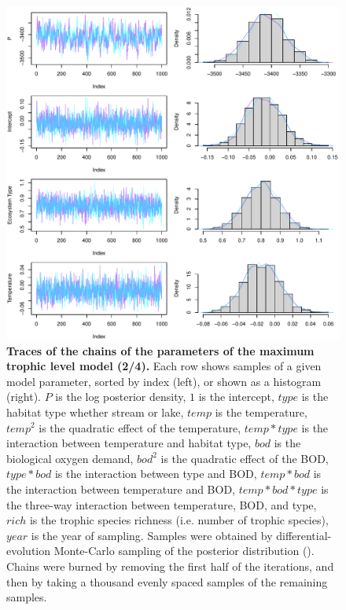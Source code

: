 \documentclass[11pt, oneside]{article}
\begin{document}
\begin{figure}[H]
\begin{center}
\includegraphics[page=2, width=1\linewidth]{scripts/b0_6_4/out_mTL/fig_tracePlot_beta.pdf}
\caption{
    \textbf{Traces of the chains of the parameters of the maximum trophic level model (2/4).}
    Each row shows samples of a given model parameter, sorted by index (left), or shown as a histogram (right).
    $P$ is the log posterior density, $1$ is the intercept, $type$ is the habitat type whether stream or lake, $temp$ is the temperature, $temp^2$ is the quadratic effect of the temperature, $temp * type$ is the interaction between temperature and habitat type, $bod$ is the biological oxygen demand, $bod^2$ is the quadratic effect of the BOD, $type * bod$ is the interaction between type and BOD, $temp * bod$ is the interaction between temperature and BOD, $temp * bod * type$ is the three-way interaction between temperature, BOD, and type, $rich$ is the trophic species richness (i.e. number of trophic species), $year$ is the year of sampling.
    Samples were obtained by differential-evolution Monte-Carlo sampling of the posterior distribution (\cite{TerBraak2006}).
    Chains were burned by removing the first half of the iterations, and then by taking a thousand evenly spaced samples of the remaining samples.
}
\end{center}
\end{figure}
\end{document}
